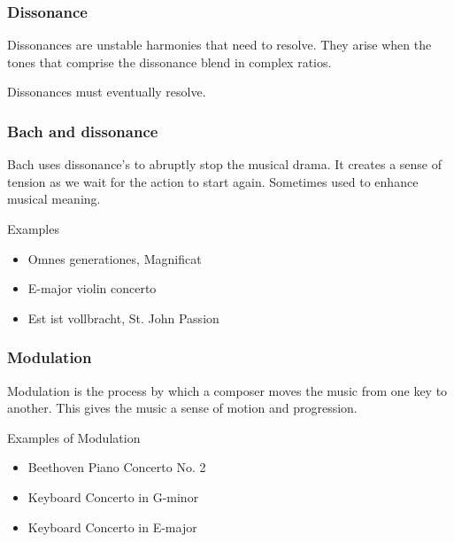 \begin{frame}
	\frametitle{Dissonance}
	Dissonances are unstable harmonies that need to resolve. They arise when the tones that comprise the dissonance blend in complex ratios.
	
	
	Dissonances must eventually resolve.
\end{frame}

\begin{frame}
	\frametitle{Bach and dissonance}
	Bach uses dissonance's to abruptly stop the musical drama. It creates a sense of tension as we wait for the action to start again. Sometimes used to enhance musical meaning.
	
		\begin{block}{Examples}
			\begin{itemize}
				\item Omnes generationes, Magnificat
				\item E-major violin concerto
				\item Est ist vollbracht, St. John Passion
			\end{itemize}		
		\end{block}
\end{frame}

\begin{frame}
	\frametitle{Modulation}
	Modulation is the process by which a composer moves the music from one key to another. This gives the music a sense of motion and progression.
	\begin{block}{Examples of Modulation}
		\begin{itemize}
			\item Beethoven Piano Concerto No. 2
			\item Keyboard Concerto in G-minor
			\item Keyboard Concerto in E-major
		\end{itemize}
	\end{block}
\end{frame}